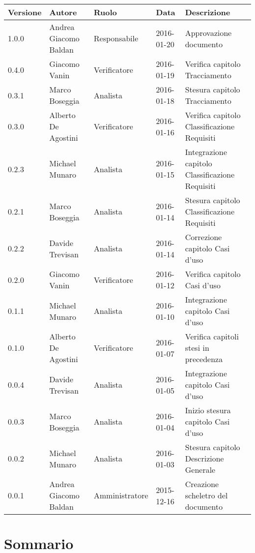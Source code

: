 \documentclass{scalatekids-article}
\begin{document}
\begin{center}
  \begin{tabular}{| l | l | l | l | p{5cm} |}
    \hline
    Versione & Autore & Ruolo & Data & Descrizione \\
    \hline
    1.0.0 & Andrea Giacomo Baldan & Responsabile & 2016-01-20 & Approvazione documento\\
    \hline
    0.4.0 & Giacomo Vanin & Verificatore & 2016-01-19 & Verifica capitolo Tracciamento\\
    \hline
    0.3.1 & Marco Boseggia & Analista & 2016-01-18 & Stesura capitolo Tracciamento\\
    \hline
    0.3.0 & Alberto De Agostini & Verificatore & 2016-01-16 & Verifica capitolo Classificazione Requisiti\\
    \hline
    0.2.3 & Michael Munaro & Analista & 2016-01-15 & Integrazione capitolo Classificazione Requisiti\\
    \hline
    0.2.1 & Marco Boseggia & Analista & 2016-01-14 & Stesura capitolo Classificazione Requisiti\\
    \hline
    0.2.2 & Davide Trevisan & Analista & 2016-01-14 & Correzione capitolo Casi d'uso\\
    \hline
    0.2.0 & Giacomo Vanin & Verificatore & 2016-01-12 & Verifica capitolo Casi d'uso\\
    \hline
    0.1.1 & Michael Munaro & Analista & 2016-01-10 & Integrazione capitolo Casi d'uso\\
    \hline
    0.1.0 & Alberto De Agostini & Verificatore & 2016-01-07 & Verifica capitoli stesi in precedenza\\
    \hline
    0.0.4 & Davide Trevisan & Analista & 2016-01-05 & Integrazione capitolo Casi d'uso\\
    \hline
    0.0.3 & Marco Boseggia & Analista & 2016-01-04 & Inizio stesura capitolo Casi d'uso\\
    \hline
    0.0.2 & Michael Munaro & Analista & 2016-01-03 & Stesura capitolo Descrizione Generale\\
    \hline
    0.0.1 & Andrea Giacomo Baldan & Amministratore & 2015-12-16 & Creazione scheletro del documento\\
    \hline
  \end{tabular}
\end{center}
\tableofcontents
\newpage
{}
\section{Sommario}
\end{document}
